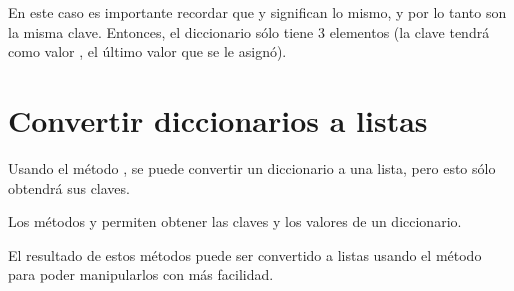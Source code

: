 
En este caso es importante recordar que  y  significan lo mismo, y por lo tanto son la misma clave.
Entonces, el diccionario  sólo tiene 3 elementos (la clave  tendrá como valor , el último valor que se le asignó).


\section{Convertir diccionarios a listas}

Usando el método , se puede convertir un diccionario a una lista, pero esto sólo obtendrá sus claves.


Los métodos  y  permiten obtener las claves y los valores de un diccionario.


El resultado de estos métodos puede ser convertido a listas usando el método  para poder manipularlos con más facilidad.


\clearpage